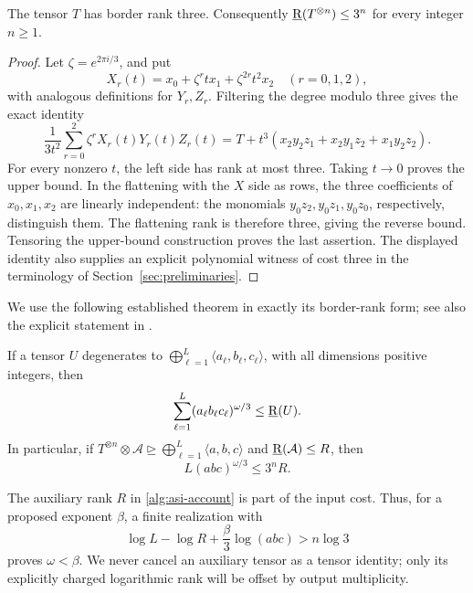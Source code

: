\begin{lemma}
\label{alg:cw-rank}
The tensor \(T\) has border rank three.  Consequently
\(\operatorname{\underline R}(T^{\otimes n})\leq3^n\) for every integer \(n\geq1\).
\end{lemma}
\begin{proof}
Let \(\zeta=e^{2\pi i/3}\), and put
\[
 X_r(t)=x_0+\zeta^r t x_1+\zeta^{2r}t^2x_2
 \quad (r=0,1,2),
\]
with analogous definitions for \(Y_r,Z_r\).  Filtering the degree modulo
three gives the exact identity
\[
 \frac{1}{3t^2}\sum_{r=0}^2\zeta^r X_r(t)Y_r(t)Z_r(t)
 =T+t^3(x_2y_2z_1+x_2y_1z_2+x_1y_2z_2).
\]
For every nonzero \(t\), the left side has rank at most three.  Taking
\(t\to0\) proves the upper bound.  In the flattening with the \(X\) side
as rows, the three coefficients of \(x_0,x_1,x_2\) are linearly independent:
the monomials \(y_0z_2,y_0z_1,y_0z_0\), respectively, distinguish them.
The flattening rank is therefore three, giving the reverse bound.  Tensoring
the upper-bound construction proves the last assertion.
The displayed identity also supplies an explicit polynomial witness of
cost three in the terminology of Section~\ref{sec:preliminaries}.
\end{proof}

We use the following established theorem in exactly its border-rank form;
see also the explicit statement in
\citet[Theorem~3.1]{afl}.

\begin{theorem}
\label{thm:asi}
If a tensor \(U\) degenerates to
\(\bigoplus_{\ell=1}^{L}\langle a_\ell,b_\ell,c_\ell\rangle\), with all
dimensions positive integers, then
\[
 \sum_{\ell=1}^{L}(a_\ell b_\ell c_\ell)^{\omega/3}
 \leq\operatorname{\underline R}(U).
\]
In particular, if
\(T^{\otimes n}\otimes\mathcal A\unrhd
\bigoplus_{\ell=1}^{L}\langle a,b,c\rangle\)
and \(\operatorname{\underline R}(\mathcal A)\leq R\), then
\begin{equation}
 L(abc)^{\omega/3}\leq3^nR.
 \label{alg:asi-account}
\end{equation}
\end{theorem}

The auxiliary rank \(R\) in \eqref{alg:asi-account} is part of the input
cost.  Thus, for a proposed exponent \(\beta\), a finite realization with
\begin{equation}
 \log L-\log R+\frac{\beta}{3}\log(abc)>n\log3
 \label{alg:strict-score}
\end{equation}
proves \(\omega<\beta\).  We never cancel an auxiliary tensor as a tensor
identity; only its explicitly charged logarithmic rank will be offset by
output multiplicity.

